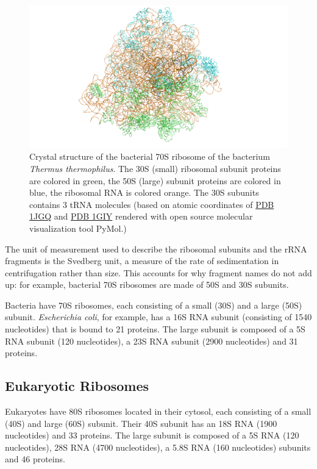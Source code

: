 \begin{figure}

{\centering \includegraphics[width=0.7\linewidth]{./figures/translation/ttribosome} 

}

\caption{Crystal structure of the bacterial 70S ribosome of the bacterium \emph{Thermus thermophilus}. The 30S (small) ribosomal subunit proteins are colored in green, the 50S (large) subunit proteins are colored in blue, the ribosomal RNA is colored orange. The 30S subunits contains 3 tRNA molecules (based on atomic coordinates of \href{https://www.rcsb.org/structure/1jgq}{PDB 1JGQ} and \href{(https://www.rcsb.org/structure/1jgq)}{PDB 1GIY} rendered with open source molecular visualization tool PyMol.)}\label{fig:ttribosome}
\end{figure}

The unit of measurement used to describe the ribosomal subunits and the rRNA fragments is the Svedberg unit, a measure of the rate of sedimentation in centrifugation rather than size. This accounts for why fragment names do not add up: for example, bacterial 70S ribosomes are made of 50S and 30S subunits.

Bacteria have 70S ribosomes, each consisting of a small (30S) and a large (50S) subunit. \emph{Escherichia coli}, for example, has a 16S RNA subunit (consisting of 1540 nucleotides) that is bound to 21 proteins. The large subunit is composed of a 5S RNA subunit (120 nucleotides), a 23S RNA subunit (2900 nucleotides) and 31 proteins.

\hypertarget{eukaryotic-ribosomes}{%
\subsection{Eukaryotic Ribosomes}\label{eukaryotic-ribosomes}}

Eukaryotes have 80S ribosomes located in their cytosol, each consisting of a small (40S) and large (60S) subunit. Their 40S subunit has an 18S RNA (1900 nucleotides) and 33 proteins. The large subunit is composed of a 5S RNA (120 nucleotides), 28S RNA (4700 nucleotides), a 5.8S RNA (160 nucleotides) subunits and 46 proteins.



